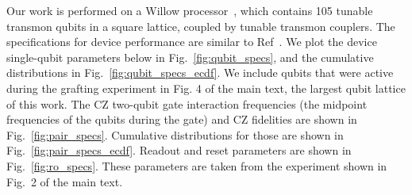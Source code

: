 Our work is performed on a Willow processor~\cite{acharya_quantum_2025}, which contains 105 tunable transmon qubits in a square lattice, coupled by tunable transmon couplers. The specifications for device performance are similar to Ref~\cite{acharya_quantum_2025}.  We plot the device single-qubit parameters below in Fig.~\ref{fig:qubit_specs}, and the cumulative distributions in Fig.~\ref{fig:qubit_specs_ecdf}. We include qubits that were active during the grafting experiment in Fig. 4 of the main text, the largest qubit lattice of this work. The CZ two-qubit gate interaction frequencies (the midpoint frequencies of the qubits during the gate) and CZ fidelities are shown in Fig.~\ref{fig:pair_specs}. Cumulative distributions for those are shown in Fig.~\ref{fig:pair_specs_ecdf}. 
Readout and reset parameters are shown in Fig.~\ref{fig:ro_specs}. These parameters are taken from the experiment shown in Fig.~2 of the main text. 

